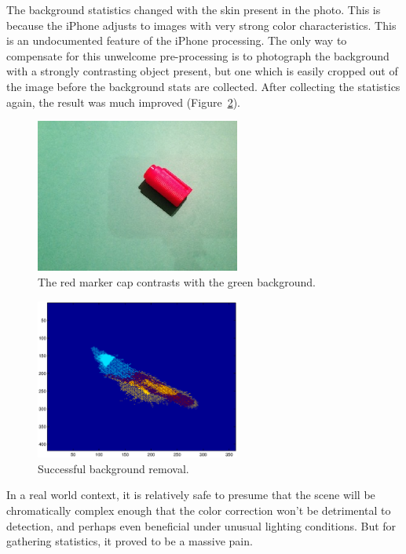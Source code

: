 The background statistics changed with the skin present in the photo. This is because the iPhone adjusts to images with very strong color characteristics. This is an undocumented feature of the iPhone processing. The only way to compensate for this unwelcome pre-processing is to photograph the background with a strongly contrasting object present, but one which is easily cropped out of the image before the background stats are collected. After collecting the statistics again, the result was much improved (Figure~\ref{fig:BGSuccess}).

\begin{figure}[h!]
  \centering
    \includegraphics[width=0.60\textwidth]{Chapter3/Figs/bg_cap.eps}
    \caption{The red marker cap contrasts with the green background.}  \label{fig:BGCap}
\end{figure}

\begin{figure}[h!]
  \centering
    \includegraphics[width=0.60\textwidth]{Chapter3/Figs/xy_bg_success.eps}
    \caption{Successful background removal.}  \label{fig:BGSuccess}
\end{figure}

In a real world context, it is relatively safe to presume that the scene will be chromatically complex enough that the color correction won't be detrimental to detection, and perhaps even beneficial under unusual lighting conditions. But for gathering statistics, it proved to be a massive pain.


